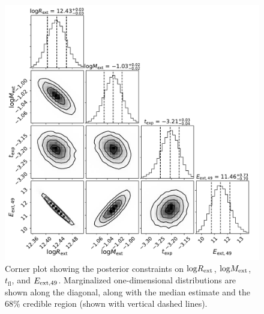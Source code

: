 \documentclass[twocolumn]{aastex63}
\begin{document}
\begin{CJK*}{UTF8}{gbsn}
\begin{figure}[htbp!]
	\centering
	\includegraphics[width=\columnwidth]{figures/corner_P15.pdf}
	\caption{Corner plot showing the posterior constraints on ${\rm log}R_{\rm ext}$, ${\rm log}M_{\rm 
			ext}$, $t_\mathrm{fl}$, and $E_{\rm ext, 49}$. Marginalized one-dimensional distributions are 
		shown along the diagonal, along with the median estimate and the 68\% credible region (shown 
		with vertical 
		dashed 
		lines).	\label{fig:pirocorner}}
\end{figure}




\end{CJK*}
\end{document}
